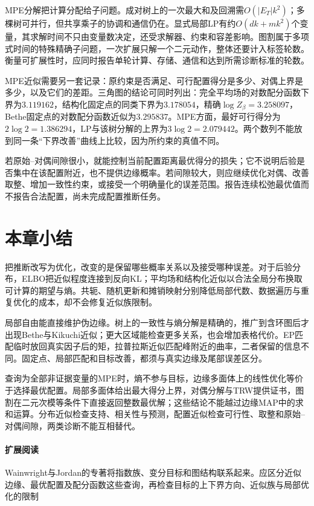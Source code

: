 MPE分解把计算分配给子问题。成对树上的一次最大和及回溯需$O(|E_T|k^2)$；多棵树可并行，但共享乘子的协调和通信仍在。显式局部LP有约$O(dk+mk^2)$个变量，其求解时间不只由变量数决定，还受求解器、约束和容差影响。图割属于多项式时间的特殊精确子问题，一次扩展只解一个二元动作，整体还要计入标签轮数。衡量可扩展性时，应同时报告单轮计算、存储、通信和达到所需诊断标准的轮数。

MPE近似需要另一套记录：原约束是否满足、可行配置得分是多少、对偶上界是多少，以及它们的差距。三角图的结论可同时列出：完全平均场的对数配分函数下界为$3.119162$，结构化固定点的同类下界为$3.178054$，精确$\log Z_\beta=3.258097$，Bethe固定点的对数配分函数近似为$3.295837$。MPE方面，最好可行得分为$2\log2=1.386294$，LP与该树分解的上界为$3\log2=2.079442$。两个数列不能放到同一条“下界改善”曲线上比较，因为所约束的真值不同。

若原始--对偶间隙很小，就能控制当前配置距离最优得分的损失；它不说明后验是否集中在该配置附近，也不提供边缘概率。若间隙较大，则应继续优化对偶、改善取整、增加一致性约束，或接受一个明确量化的误差范围。报告连续松弛最优值而不报告合法配置，尚未完成配置推断任务。

\section{本章小结}
\label{sec:pgm-variational-summary}

把推断改写为优化，改变的是保留哪些概率关系以及接受哪种误差。对于后验分布，ELBO把近似程度连接到反向KL；平均场和结构化近似以合法全局分布换取可计算的期望与熵。共轭、随机更新和摊销映射分别降低局部代数、数据遍历与重复优化的成本，却不会修复近似族限制。

局部自由能直接维护伪边缘。树上的一致性与熵分解是精确的，推广到含环图后才出现Bethe与Kikuchi近似；更大区域能检查更多关系，也会增加表格代价。EP匹配临时放回真实因子后的矩，拉普拉斯近似匹配峰附近的曲率，二者保留的信息不同。固定点、局部匹配和目标改善，都须与真实边缘及尾部误差区分。

查询为全部非证据变量的MPE时，熵不参与目标，边缘多面体上的线性优化等价于选择最优配置。局部多面体给出最大得分上界，对偶分解与TRW提供证书，图割在二元次模等条件下直接返回整数最优解；这些结论不能越过边缘MAP中的求和运算。分布近似检查支持、相关性与预测，配置近似检查可行性、取整和原始--对偶间隙，两类诊断不能互相替代。

\paragraph{扩展阅读}
Wainwright与Jordan的专著将指数族、变分目标和图结构联系起来。应区分近似边缘、最优配置及配分函数这些查询，再检查目标的上下界方向、近似族与局部优化的限制
